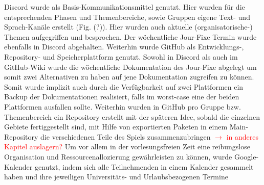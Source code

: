 Discord wurde als Basis-Kommunikationsmittel genutzt. Hier wurden für die entsprechenden Phasen und Themenbereiche, sowie Gruppen eigene Text- und Sprach-Kanäle erstellt (Fig. (?)). Hier wurden auch aktuelle (organisatorische-) Themen aufgegriffen und besprochen. Der wöchentliche Jour-Fixe Termin wurde ebenfalls in Discord abgehalten. Weiterhin wurde GitHub als Entwicklungs-, Repository- und Speicherplattform genutzt. Sowohl in Discord als auch im GitHub-Wiki wurde die wöchentliche Dokumentation des Jour-Fixe abgelegt um somit zwei Alternativen zu haben auf jene Dokumentation zugreifen zu können. Somit wurde implizit auch durch die Verfügbarkeit auf zwei Plattformen ein Backup der Dokumentationen realisiert, falls im worst-case eine der beiden Plattformen ausfallen sollte. Weiterhin wurden in GitHub pro Gruppe bzw. Themenbereich ein Repository erstellt mit der späteren Idee, sobald die einzelnen Gebiete fertiggestellt sind, mit Hilfe von exportierten Paketen in einem Main-Repository die verschiedenen Teile des Spiels zusammenzubringen  \textcolor{red}{$\rightarrow$ in anderes Kapitel auslagern?} Um vor allem in der vorlesungsfreien Zeit eine reibungslose Organisation und Ressourcenallozierung gewährleisten zu können, wurde Google-Kalender genutzt, indem sich alle Teilnehmenden in einem Kalender gesammelt haben und ihre jeweiligen Universitäts- und Urlaubsbezogenen Termine 